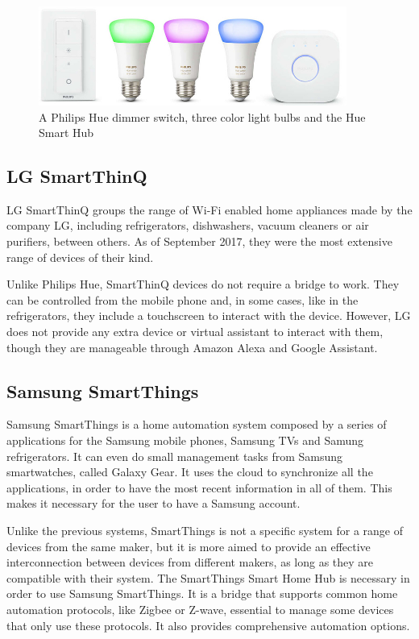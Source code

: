 \begin{figure}
	\centering
	\includegraphics[width=0.9\textwidth]{images/Chapter_04/philips-hue.jpg}
	\caption{A Philips Hue dimmer switch, three color light bulbs and the Hue Smart Hub}
	\label{fig:philips-hue}
\end{figure}

\subsection{LG SmartThinQ}
LG SmartThinQ groups the range of Wi-Fi enabled home appliances made by the company LG, including refrigerators, dishwashers,
vacuum cleaners or air purifiers, between others. As of September 2017, they were the most extensive range of devices of their kind.\cite{lgSmartThinq}

Unlike Philips Hue, SmartThinQ devices do not require a bridge to work. They can be controlled from the mobile phone and, in some
cases, like in the refrigerators, they include a touchscreen to interact with the device. However, LG does not provide any extra device
or virtual assistant to interact with them, though they are manageable through Amazon Alexa and Google Assistant.

\subsection{Samsung SmartThings}
Samsung SmartThings is a home automation system composed by a series of applications for the Samsung mobile phones, Samsung
TVs and Samung refrigerators. It can even do small management tasks from Samsung smartwatches, called Galaxy Gear. It uses the
cloud to synchronize all the applications, in order to have the most recent information in all of them. This makes it necessary for the
user to have a Samsung account.\cite{samsungSmartthings}

Unlike the previous systems, SmartThings is not a specific system for a range of devices from the same maker, but it is more aimed
to provide an effective interconnection between devices from different makers, as long as they are compatible with their system.
The SmartThings Smart Home Hub is necessary in order to use Samsung SmartThings. It is a bridge that supports common home 
automation protocols, like Zigbee or Z-wave, essential to manage some devices that only use these protocols. It also provides 
comprehensive automation options.\cite{smartHomeBeginner}

